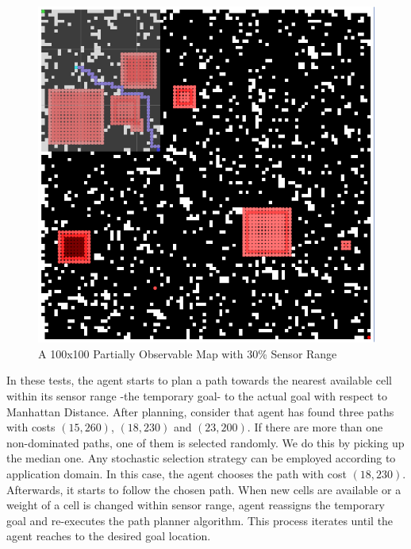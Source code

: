 \documentclass[10pt,journal]{IEEEtran}
\begin{document}
\begin{figure}
\centering
\includegraphics[scale=0.3]{experimental/initialSearch}
\caption{A 100x100 Partially Observable Map with 30\% Sensor Range}
\label{fig:initialSearch}
\end{figure}

In these tests, the agent starts to plan a path towards the nearest available cell within its sensor range -the temporary goal- to the actual goal with respect to Manhattan Distance. After planning, consider that agent has found three paths with costs $(15, 260)$, $(18, 230)$ and $(23, 200)$. If there are more than one non-dominated paths, one of them is selected randomly. We do this by picking up the median one. Any stochastic selection strategy can be employed according to application domain. In this case, the agent chooses the path with cost $(18, 230)$. Afterwards, it starts to follow the chosen path. When new cells are available or a weight of a cell is changed within sensor range, agent reassigns the temporary goal and re-executes the path planner algorithm. This process iterates until the agent reaches to the desired goal location.
\end{document}
